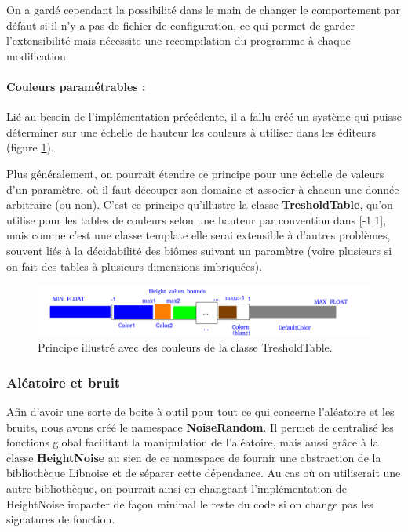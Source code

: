 \documentclass[a4paper]{article}
\begin{document}
On a gardé cependant la possibilité dans le main de changer le comportement par défaut si il n'y a pas de fichier de configuration, ce qui permet de garder l'extensibilité mais nécessite une recompilation du programme à chaque modification.

\paragraph{Couleurs paramétrables :}

Lié au besoin de l'implémentation précédente, il a fallu créé un système qui puisse déterminer sur une échelle de hauteur les couleurs à utiliser dans les éditeurs (figure \ref{archi_treshold}).

Plus généralement, on pourrait étendre ce principe pour une échelle de valeurs d'un paramètre, où il faut découper son domaine et associer à chacun une donnée arbitraire (ou non). C'est ce principe qu'illustre la classe \textbf{TresholdTable}, qu'on utilise pour les tables de couleurs selon une hauteur par convention dans [-1,1], mais comme c'est une classe template elle serai extensible à d'autres problèmes, souvent liés à la décidabilité des biômes suivant un paramètre (voire plusieurs si on fait des tables à plusieurs dimensions imbriquées).

\begin{figure}[!ht]
        \begin{center} \includegraphics[width=\linewidth]{img/archi/example_treshold.png}\end{center}
        \caption{\label{archi_treshold}Principe illustré avec des couleurs de la classe TresholdTable.}
\end{figure}

\newpage
\subsubsection{Aléatoire et bruit}

Afin d'avoir une sorte de boite à outil pour tout ce qui concerne l'aléatoire et les bruits, nous avons créé le namespace \textbf{NoiseRandom}. Il permet de centralisé les fonctions global facilitant la manipulation de l'aléatoire, mais aussi grâce à la classe \textbf{HeightNoise} au sien de ce namespace de fournir une abstraction de la bibliothèque Libnoise et de séparer cette dépendance. Au cas où on utiliserait une autre bibliothèque, on pourrait ainsi en changeant l'implémentation de HeightNoise impacter de façon minimal le reste du code si on change pas les signatures de fonction.
\end{document}
